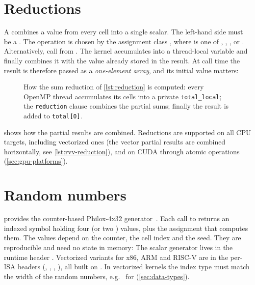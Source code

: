 \section{Reductions}\label{sec:reductions}

A  combines a value from every cell into a single scalar. The left-hand
side must be a . The operation is chosen by the assignment class
, where  is one of , ,
,  or . Alternatively, call
 from
.
The kernel accumulates into a thread-local variable and finally combines it with the
value already stored in the result. At call time the result is therefore passed as a
\emph{one-element array}, and its initial value matters:

\begin{figure}[htbp]
  \centering
  
  \caption[An OpenMP sum reduction]{How the sum reduction of \cref{lst:reduction} is computed: every OpenMP thread accumulates its cells into a private \texttt{total\_local}; the \texttt{reduction} clause combines the partial sums; finally the result is added to \texttt{total[0]}.}
  \label{fig:reduction}
\end{figure}
 shows how the partial results are combined. Reductions are
supported on all CPU targets, including vectorized ones (the vector
partial results are combined horizontally, see \cref{lst:rvv-reduction}), and on CUDA
through atomic operations (\cref{sec:gpu-platforms}).

\section{Random numbers}

 provides the counter-based Philox-4x32
generator~\cite{random123}. Each call to  returns an
indexed symbol holding four  (or two ) values, plus the
assignment that computes them. The values depend on the counter, the cell index and the
seed. They are reproducible and need no state in memory:
The scalar generator lives in the runtime header .
Vectorized variants for x86, ARM and RISC-V are in the per-ISA headers (,
, , ), all built on
. In vectorized kernels the index type must match the width of
the random numbers, e.g.\  for 
(\cref{sec:data-types}).

